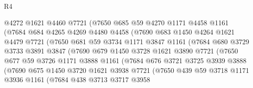 \begin{lexlean}{R4}
\begin{coremodule}
                  @4272
                  @1621
                  @4460
                  @7721
                  (@7650
                    @685
                    @59
                    @4270
                    @1171
                    @4458
                    @1161
                    (@7684
                      @684
                      @4265
                      @4269
                      @4480
                      @4458
                      (@7690
                        @683
                        @1450
                        @4264
                        @1621
                        @4479
                        @7721
                        (@7650
                          @681
                          @59
                          @3734
                          @1171
                          @3847
                          @1161
                          (@7684
                            @680
                            @3729
                            @3733
                            @3891
                            @3847
                            (@7690
                              @679
                              @1450
                              @3728
                              @1621
                              @3890
                              @7721
                              (@7650
                                @677
                                @59
                                @3726
                                @1171
                                @3888
                                @1161
                                (@7684
                                  @676
                                  @3721
                                  @3725
                                  @3939
                                  @3888
                                  (@7690
                                    @675
                                    @1450
                                    @3720
                                    @1621
                                    @3938
                                    @7721
                                    (@7650
                                      @439
                                      @59
                                      @3718
                                      @1171
                                      @3936
                                      @1161
                                      (@7684
                                        @438
                                        @3713
                                        @3717
                                        @3958

\end{coremodule}
\end{lexlean}
